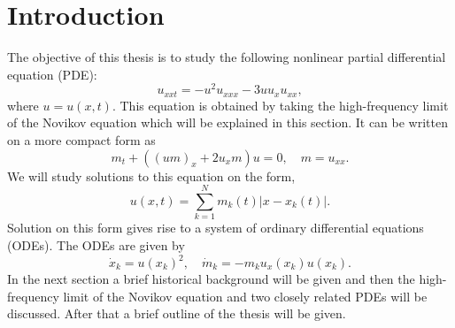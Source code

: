 \documentclass[english,master]{liumaiex}
\theoremstyle{plain}
\theoremstyle{definition}
\begin{document}




\tableofcontents

\newpage



%
%

\section{Introduction}

The objective of this thesis is to study the following nonlinear partial differential equation (PDE):
\begin{equation}
	u_{xxt} = -u^2u_{xxx} - 3uu_xu_{xx},
\end{equation}
where $u = u(x, t)$. This equation is obtained by taking the high-frequency limit of the Novikov equation which will be explained in this section. It can be written on a more compact form as
\begin{equation}
	m_t + ((um)_x + 2u_xm) u = 0,\quad m = u_{xx}.
\end{equation}
We will study solutions to this equation on the form,
\begin{equation}
	u(x, t) = \sum_{k = 1}^{N} m_k(t) |x - x_k(t)|.
\end{equation}
Solution on this form gives rise to a system of ordinary differential equations (ODEs). The ODEs are given by
\begin{equation}
	\dot{x}_k = u(x_k)^2, \quad
	\dot{m}_k = -m_ku_x(x_k)u(x_k).
\end{equation}
In the next section a brief historical background will be given and then the high-frequency limit of the Novikov equation and two closely related PDEs will be discussed. After that a brief outline of the thesis will be given.
\end{document}
